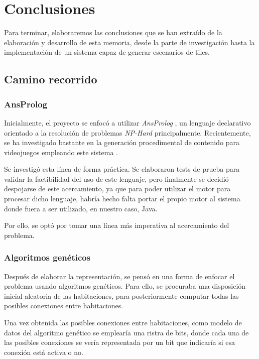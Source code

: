 \chapter{Conclusiones}\label{cap:capitulo9}

Para terminar, elaboraremos las conclusiones que se han extraído de la elaboración y desarrollo de esta memoria, desde la parte de investigación hasta la implementación de un sistema capaz de generar escenarios de tiles.

\section{Camino recorrido}

\subsection{AnsProlog}

Inicialmente, el proyecto se enfocó a utilizar \emph{AnsProlog} \cite{ansprolog}, un lenguaje declarativo orientado a la resolución de problemas \emph{NP-Hard} \cite{nphard} principalmente. Recientemente, se ha investigado bastante en la generación procedimental de contenido para videojuegos empleando este sistema \cite{pcgbookchap8}.

Se investigó esta línea de forma práctica. Se elaboraron tests de prueba \cite{ghcspalesegdia} para validar la factibilidad del uso de este lenguaje, pero finalmente se decidió despojarse de este acercamiento, ya que para poder utilizar el motor para procesar dicho lenguaje, habría hecho falta portar el propio motor al sistema donde fuera a ser utilizado, en nuestro caso, Java.

Por ello, se optó por tomar una línea más imperativa al acercamiento del problema.

\subsection{Algoritmos genéticos}

Después de elaborar la representación, se pensó en una forma de enfocar el problema usando algoritmos genéticos. Para ello, se procuraba una disposición inicial aleatoria de las habitaciones, para posteriormente computar todas las posibles conexiones entre habitaciones.

Una vez obtenida las posibles conexiones entre habitaciones, como modelo de datos del algoritmo genético se emplearía una ristra de bits, donde cada una de las posibles conexiones se vería representada por un bit que indicaría si esa conexión está activa o no.

